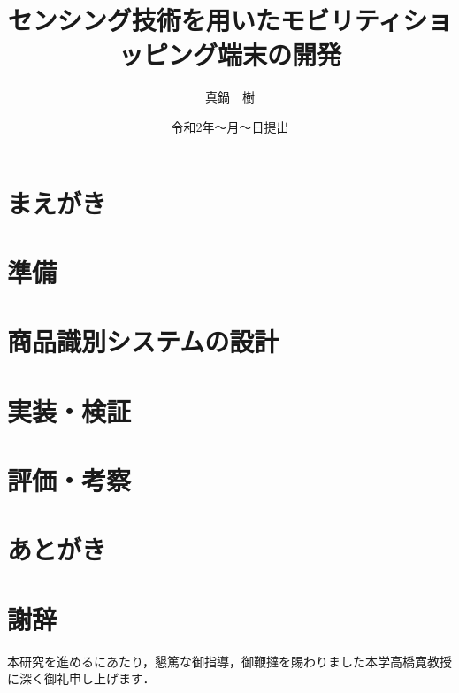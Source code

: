 
\newenvironment{indention}[1]{\par
\addtolength{\leftskip}{#1}
\begingroup}{\endgroup\par}

\title{センシング技術を用いたモビリティショッピング端末の開発}
\author{真鍋　樹}
\date{令和2年～月～日提出}


\maketitle
\tableofcontents
\cleardoublepage
{}

\chapter{まえがき}


\chapter{準備}


\chapter{商品識別システムの設計}





\chapter{実装・検証}




\chapter{評価・考察}

%
%

\chapter{あとがき}



\newpage
{}
\chapter*{謝辞}
本研究を進めるにあたり，懇篤な御指導，御鞭撻を賜わりました本学高橋寛教授に深く御礼申し上げます．

